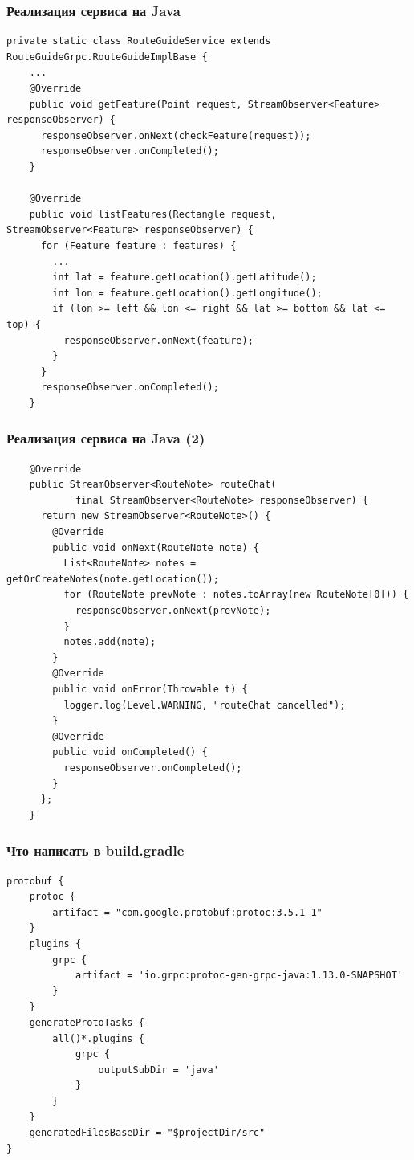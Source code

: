 \documentclass[xetex,mathserif,serif]{beamer}
\begin{document}
	\begin{frame}[fragile]
		\frametitle{Реализация сервиса на Java}
		\begin{scriptsize}
			\begin{verbatim}
private static class RouteGuideService extends RouteGuideGrpc.RouteGuideImplBase {
    ...
    @Override
    public void getFeature(Point request, StreamObserver<Feature> responseObserver) {
      responseObserver.onNext(checkFeature(request));
      responseObserver.onCompleted();
    }

    @Override
    public void listFeatures(Rectangle request, StreamObserver<Feature> responseObserver) {
      for (Feature feature : features) {
        ...
        int lat = feature.getLocation().getLatitude();
        int lon = feature.getLocation().getLongitude();
        if (lon >= left && lon <= right && lat >= bottom && lat <= top) {
          responseObserver.onNext(feature);
        }
      }
      responseObserver.onCompleted();
    }
			\end{verbatim}
		\end{scriptsize}
	\end{frame}

	\begin{frame}[fragile]
		\frametitle{Реализация сервиса на Java (2)}
		\begin{scriptsize}
			\begin{verbatim}
    @Override
    public StreamObserver<RouteNote> routeChat(
            final StreamObserver<RouteNote> responseObserver) {
      return new StreamObserver<RouteNote>() {
        @Override
        public void onNext(RouteNote note) {
          List<RouteNote> notes = getOrCreateNotes(note.getLocation());
          for (RouteNote prevNote : notes.toArray(new RouteNote[0])) {
            responseObserver.onNext(prevNote);
          }
          notes.add(note);
        }
        @Override
        public void onError(Throwable t) {
          logger.log(Level.WARNING, "routeChat cancelled");
        }
        @Override
        public void onCompleted() {
          responseObserver.onCompleted();
        }
      };
    }
			\end{verbatim}
		\end{scriptsize}
	\end{frame}

	\begin{frame}[fragile]
		\frametitle{Что написать в build.gradle}
		\begin{small}
			\begin{verbatim}
protobuf {
    protoc {
        artifact = "com.google.protobuf:protoc:3.5.1-1"
    }
    plugins {
        grpc {
            artifact = 'io.grpc:protoc-gen-grpc-java:1.13.0-SNAPSHOT'
        }
    }
    generateProtoTasks {
        all()*.plugins {
            grpc {
                outputSubDir = 'java'
            }
        }
    }
    generatedFilesBaseDir = "$projectDir/src"
}
			\end{verbatim}
		\end{small}
	\end{frame}
\end{document}
